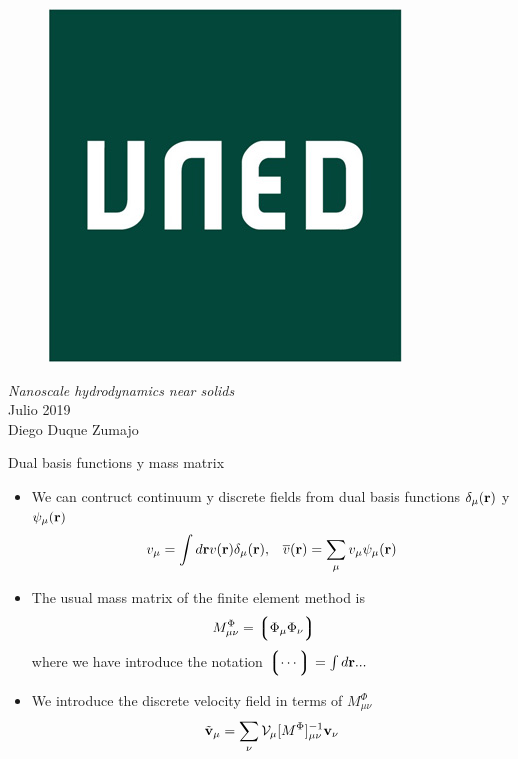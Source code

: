 \documentclass{beamer}
\newcommand{\llg}{\left\lgroup}
\newcommand{\rlg}{\right\rgroup}
\begin{document}
\begin{frame}
\begin{figure}
\includegraphics[width=0.2\linewidth]{logo}
\end{figure}
  \vspace{0.5cm}  
\begin{center}
\textit{Nanoscale hydrodynamics near solids}\\
Julio 2019\\
Diego Duque Zumajo
\end{center}

\end{frame}

\begin{frame}{Dual basis functions y mass matrix}
  \begin{itemize}
  \item We can contruct continuum y discrete fields from dual basis functions $\delta_{\mu}({\bf r})$ y $\psi_\mu({\bf r})$ 
    \begin{align}
      v_\mu=\int d{\bf r}v({\bf r})\delta_\mu({\bf r}),&&
        \overline{v}({\bf r}) =\sum_{\mu}v_\mu\psi_\mu({\bf r})
    \nonumber
    \end{align}
    \item The usual mass matrix of the finite element method is
      \begin{align}
      M^\Phi_{\mu\nu}&=\llg\Phi_\mu\Phi_\nu\rlg  
      \nonumber
      \end{align}
      where we have introduce the notation $\llg\cdots\rlg=\int d{\bf r}...$
    \item We introduce the discrete velocity field in terms of $M^\Phi_{\mu\nu}$
      \begin{align}
        \tilde{{\bf v}}_{\mu}=\sum_{\nu}{\cal V}_{\mu}[M^{\Phi}]^{-1}_{\mu\nu}{\bf v}_{\nu}
        \nonumber
      \end{align}
  \end{itemize}
\end{frame}
\end{document}
